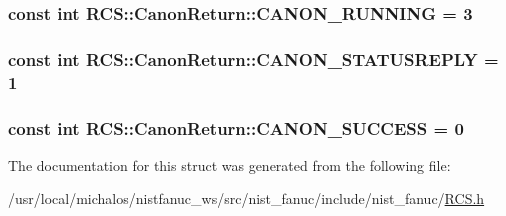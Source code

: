 \hypertarget{structRCS_1_1CanonReturn_a729c1c087b28d380a8bbf459e810a11a}{
\subsubsection[{C\-A\-N\-O\-N\-\_\-\-R\-U\-N\-N\-I\-N\-G}]{\setlength{\rightskip}{0pt plus 5cm}const int R\-C\-S\-::\-Canon\-Return\-::\-C\-A\-N\-O\-N\-\_\-\-R\-U\-N\-N\-I\-N\-G = 3\hspace{0.3cm}{\ttfamily [static]}}}\label{structRCS_1_1CanonReturn_a729c1c087b28d380a8bbf459e810a11a}
\hypertarget{structRCS_1_1CanonReturn_af927d2c2ce5224825b9ce0c4ba90cd1b}{
\subsubsection[{C\-A\-N\-O\-N\-\_\-\-S\-T\-A\-T\-U\-S\-R\-E\-P\-L\-Y}]{\setlength{\rightskip}{0pt plus 5cm}const int R\-C\-S\-::\-Canon\-Return\-::\-C\-A\-N\-O\-N\-\_\-\-S\-T\-A\-T\-U\-S\-R\-E\-P\-L\-Y = 1\hspace{0.3cm}{\ttfamily [static]}}}\label{structRCS_1_1CanonReturn_af927d2c2ce5224825b9ce0c4ba90cd1b}
\hypertarget{structRCS_1_1CanonReturn_aadc6dc0f6e906c16d01680c6d85c7de4}{
\subsubsection[{C\-A\-N\-O\-N\-\_\-\-S\-U\-C\-C\-E\-S\-S}]{\setlength{\rightskip}{0pt plus 5cm}const int R\-C\-S\-::\-Canon\-Return\-::\-C\-A\-N\-O\-N\-\_\-\-S\-U\-C\-C\-E\-S\-S = 0\hspace{0.3cm}{\ttfamily [static]}}}\label{structRCS_1_1CanonReturn_aadc6dc0f6e906c16d01680c6d85c7de4}


The documentation for this struct was generated from the following file\-:\begin{DoxyCompactItemize}
\item 
/usr/local/michalos/nistfanuc\-\_\-ws/src/nist\-\_\-fanuc/include/nist\-\_\-fanuc/\hyperlink{RCS_8h}{R\-C\-S.\-h}\end{DoxyCompactItemize}

